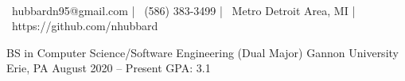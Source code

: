 \documentclass[]{awesome-cv}
\begin{document}
    
\begin{center}
	  \\
	\vspace{2mm}
	{\faEnvelope\ hubbardn95@gmail.com} | {\faMobile\ (586) 383-3499} | {\faMapMarker\ Metro Detroit Area, MI} | {\faLink\ https://github.com/nhubbard}
\end{center}
\begin{cventries}
	\cventry
	{BS in Computer Science/Software Engineering (Dual Major)}
	{Gannon University}
	{Erie, PA}
	{August 2020 – Present}
	{GPA: 3.1}
\end{cventries}
\end{document}
